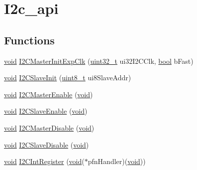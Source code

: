 \hypertarget{group__i2c__api}{}\section{I2c\+\_\+api}
\label{group__i2c__api}
\subsection*{Functions}
\begin{DoxyCompactItemize}
\item 
\hyperlink{usb__devapi_8h_afabf60e7f57651d6d595a02c75f07cd0}{void} \hyperlink{group__i2c__api_ga28996e36955ae56b9c312b961278d762}{I2\+C\+Master\+Init\+Exp\+Clk} (\hyperlink{_p_e___types_8h_a33594304e786b158f3fb30289278f5af}{uint32\+\_\+t} ui32\+I2\+C\+Clk, \hyperlink{_p_e___types_8h_a97a80ca1602ebf2303258971a2c938e2}{bool} b\+Fast)
\item 
\hyperlink{usb__devapi_8h_afabf60e7f57651d6d595a02c75f07cd0}{void} \hyperlink{group__i2c__api_gab138e14c2fe1d19972e388b8638fb695}{I2\+C\+Slave\+Init} (\hyperlink{_p_e___types_8h_aba7bc1797add20fe3efdf37ced1182c5}{uint8\+\_\+t} ui8\+Slave\+Addr)
\item 
\hyperlink{usb__devapi_8h_afabf60e7f57651d6d595a02c75f07cd0}{void} \hyperlink{group__i2c__api_gaceb8f026728b5c8d5675f641caedfb29}{I2\+C\+Master\+Enable} (\hyperlink{usb__devapi_8h_afabf60e7f57651d6d595a02c75f07cd0}{void})
\item 
\hyperlink{usb__devapi_8h_afabf60e7f57651d6d595a02c75f07cd0}{void} \hyperlink{group__i2c__api_ga6f51060e7ecc4f4005e9314a877ae4b6}{I2\+C\+Slave\+Enable} (\hyperlink{usb__devapi_8h_afabf60e7f57651d6d595a02c75f07cd0}{void})
\item 
\hyperlink{usb__devapi_8h_afabf60e7f57651d6d595a02c75f07cd0}{void} \hyperlink{group__i2c__api_gabf229e58f06ff0a26bf66e9cdbf03b56}{I2\+C\+Master\+Disable} (\hyperlink{usb__devapi_8h_afabf60e7f57651d6d595a02c75f07cd0}{void})
\item 
\hyperlink{usb__devapi_8h_afabf60e7f57651d6d595a02c75f07cd0}{void} \hyperlink{group__i2c__api_ga00570b245dfe33620b0a89c398c2b8a1}{I2\+C\+Slave\+Disable} (\hyperlink{usb__devapi_8h_afabf60e7f57651d6d595a02c75f07cd0}{void})
\item 
\hyperlink{usb__devapi_8h_afabf60e7f57651d6d595a02c75f07cd0}{void} \hyperlink{group__i2c__api_ga09748a62aec2f3d3932f8a77b09ee173}{I2\+C\+Int\+Register} (\hyperlink{usb__devapi_8h_afabf60e7f57651d6d595a02c75f07cd0}{void}($\ast$pfn\+Handler)(\hyperlink{usb__devapi_8h_afabf60e7f57651d6d595a02c75f07cd0}{void}))

\end{DoxyCompactItemize}
